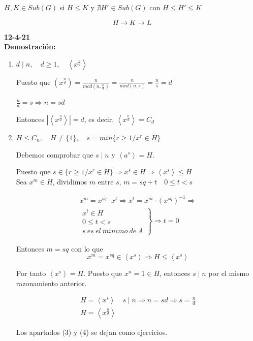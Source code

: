 \documentclass{article}
\begin{document}
\begin{enumerate}[(1)]
$H,K\in Sub(G)$ si $H\leq K$ y $\nexists H'\in Sub(G)$ con $H\leq H'\leq K$

\begin{equation*}
H\longrightarrow K \longrightarrow L
\end{equation*}
\end{enumerate}

\textbf{12-4-21} \\

\textbf{Demostración:} 
\begin{enumerate}[(1)]
\item $d\mid n, \quad d\geq 1, \quad \left\langle x^{\frac{n}{d}} \right\rangle$

Puesto que $(x^{\frac{n}{d}})=\frac{n}{mcd(n,\frac{n}{d})}=\frac{n}{mcd(n,s)}=\frac{n}{s}=d$ 

$\frac{n}{d}=s\Rightarrow n=sd$

Entonces $|\left\langle x^{\frac{n}{d}}\right\rangle|=d$, es decir, $\left\langle x^{\frac{n}{d}}\right\rangle=C_d$

\item $H\leq C_n, \quad H\neq \{1\}, \quad s=min\{r\geq 1/x^r\in H\}$

Debemos comprobar que $s\mid n$ y $\left\langle a^s \right\rangle=H$.

Puesto que $s\in \{r\geq 1/x^r\in H\}\Rightarrow x^s\in H\Rightarrow \left\langle x^s\right\rangle \leq H$ \\

Sea $x^m \in H$, dividimos $m$ entre $s$, $m=sq+t \quad 0\leq t<s$

\begin{gather*}
x^m=x^{sq}\cdot x^t \Rightarrow x^t=x^m\cdot (x^{sq})^{-1} \Rightarrow \\
\left. \begin{array}{c}
x^t\in H \\
0\leq t < s \\
s\:es\:el\:minimo\:de\:A
\end{array}\right\rbrace \Rightarrow t=0
\end{gather*}

Entonces $m=sq$ con lo que
\begin{equation*}
x^m=x^{sq}\in \left\langle x^s\right\rangle \Rightarrow H\leq \left\langle x^s\right\rangle
\end{equation*}

Por tanto $\left\langle x^s \right\rangle = H$. Puesto que $x^n=1\in H$, entonces $s\mid n$ por el mismo razonamiento anterior.

\begin{gather*}
H=\left\langle x^s\right\rangle \quad s\mid n \Rightarrow n=sd \Rightarrow s=\frac{n}{d} \\
H=\left\langle x^{\frac{n}{d}}\right\rangle
\end{gather*}

Los apartados (3) y (4) se dejan como ejercicios.
\end{enumerate}
\end{document}
